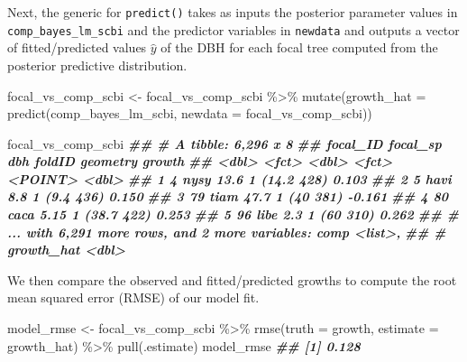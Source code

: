 \documentclass[12pt]{article}
\newenvironment{Shaded}{\begin{snugshade}}{\end{snugshade}}
\newcommand{\AttributeTok}[1]{\textcolor[rgb]{0.77,0.63,0.00}{#1}}
\newcommand{\DocumentationTok}[1]{\textcolor[rgb]{0.56,0.35,0.01}{\textbf{\textit{#1}}}}
\newcommand{\FunctionTok}[1]{\textcolor[rgb]{0.00,0.00,0.00}{#1}}
\newcommand{\NormalTok}[1]{#1}
\newcommand{\OtherTok}[1]{\textcolor[rgb]{0.56,0.35,0.01}{#1}}
\newcommand{\SpecialCharTok}[1]{\textcolor[rgb]{0.00,0.00,0.00}{#1}}
\begin{document}
Next, the generic for \texttt{predict()} takes as inputs the posterior
parameter values in \texttt{comp\_bayes\_lm\_scbi} and the predictor
variables in \texttt{newdata} and outputs a vector of fitted/predicted
values \(\widehat{y}\) of the DBH for each focal tree computed from the
posterior predictive distribution.

\begin{Shaded}
\begin{Highlighting}[]
\NormalTok{focal\_vs\_comp\_scbi }\OtherTok{\textless{}{-}}\NormalTok{ focal\_vs\_comp\_scbi }\SpecialCharTok{\%\textgreater{}\%}
  \FunctionTok{mutate}\NormalTok{(}\AttributeTok{growth\_hat =} \FunctionTok{predict}\NormalTok{(comp\_bayes\_lm\_scbi, }\AttributeTok{newdata =}\NormalTok{ focal\_vs\_comp\_scbi))}
\end{Highlighting}
\end{Shaded}

\begin{Shaded}
\begin{Highlighting}[]
\NormalTok{focal\_vs\_comp\_scbi}
\DocumentationTok{\#\# \# A tibble: 6,296 x 8}
\DocumentationTok{\#\#   focal\_ID focal\_sp   dbh foldID   geometry growth}
\DocumentationTok{\#\#      \textless{}dbl\textgreater{} \textless{}fct\textgreater{}    \textless{}dbl\textgreater{} \textless{}fct\textgreater{}     \textless{}POINT\textgreater{}  \textless{}dbl\textgreater{}}
\DocumentationTok{\#\# 1        4 nysy     13.6  1      (14.2 428)  0.103}
\DocumentationTok{\#\# 2        5 havi      8.8  1       (9.4 436)  0.150}
\DocumentationTok{\#\# 3       79 tiam     47.7  1        (40 381) {-}0.161}
\DocumentationTok{\#\# 4       80 caca      5.15 1      (38.7 422)  0.253}
\DocumentationTok{\#\# 5       96 libe      2.3  1        (60 310)  0.262}
\DocumentationTok{\#\# \# ... with 6,291 more rows, and 2 more variables: comp \textless{}list\textgreater{},}
\DocumentationTok{\#\# \#   growth\_hat \textless{}dbl\textgreater{}}
\end{Highlighting}
\end{Shaded}

We then compare the observed and fitted/predicted growths to compute the
root mean squared error (RMSE) of our model fit.

\begin{Shaded}
\begin{Highlighting}[]
\NormalTok{model\_rmse }\OtherTok{\textless{}{-}}\NormalTok{ focal\_vs\_comp\_scbi }\SpecialCharTok{\%\textgreater{}\%}
  \FunctionTok{rmse}\NormalTok{(}\AttributeTok{truth =}\NormalTok{ growth, }\AttributeTok{estimate =}\NormalTok{ growth\_hat) }\SpecialCharTok{\%\textgreater{}\%}
  \FunctionTok{pull}\NormalTok{(.estimate)}
\NormalTok{model\_rmse}
\DocumentationTok{\#\# [1] 0.128}
\end{Highlighting}
\end{Shaded}
\end{document}
